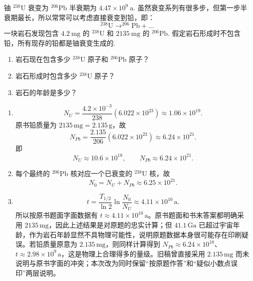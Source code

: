 \begin{exercise}\label{ex:29.25}铀 $^{238}\mathrm{U}$ 衰变为 $^{206}\mathrm{Pb}$ 半衰期为 $4.47 \times 10^9 \ \mathrm{a}$. 虽然衰变系列有很多步，但第一步半衰期最长，所以常常可以考虑直接衰变到铅，即：
$$ ^{238}\mathrm{U} \rightarrow ^{206}\mathrm{Pb} + \dots $$
一块岩石发现包含 $4.2 \ \mathrm{mg}$ 的 $^{238}\mathrm{U}$ 和 $2135 \ \mathrm{mg}$ 的 $^{206}\mathrm{Pb}$. 假定岩石形成时不包含铅，所有现存的铅都是铀衰变生成的.
\begin{enumerate}
  \item[(a)] 岩石现在包含多少 $^{238}\mathrm{U}$ 原子和 $^{206}\mathrm{Pb}$ 原子？
  \item[(b)] 岩石形成时包含多少 $^{238}\mathrm{U}$ 原子？
  \item[(c)] 岩石的年龄是多少？
\end{enumerate}\end{exercise}
\begin{solution}
\begin{enumerate}
\item[(a)]
$$
N_U=\frac{4.2\times10^{-3}}{238}(6.022\times10^{23})\approx1.06\times10^{19}.
$$
原书铅质量为 $2135\,\mathrm{mg}=2.135\,\mathrm g$，故
$$
N_{Pb}=\frac{2.135}{206}(6.022\times10^{23})\approx6.24\times10^{21}.
$$
即
$$
\boxed{N_U\approx10.6\times10^{18},\qquad N_{Pb}\approx6.24\times10^{21}}.
$$
\item[(b)] 每个最终的 $^{206}\mathrm{Pb}$ 核对应一个已衰变的 $^{238}\mathrm U$ 核，故
$$
\boxed{N_0=N_U+N_{Pb}\approx6.25\times10^{21}}.
$$
\item[(c)]
$$
t=\frac{T_{1/2}}{\ln2}\ln\frac{N_0}{N_U}\approx4.11\times10^{10}\,\mathrm a.
$$
所以按原书题面字面数据有 $\boxed{t\approx4.11\times10^{10}\,\mathrm a}$。原书题面和书末答案都明确采用 $2135\,\mathrm{mg}$，因此上述结果是对原题的忠实计算；但 $41.1\,\mathrm{Ga}$ 已超过宇宙年龄，作为岩石年龄显然不具物理可能性，说明原题数据本身很可能存在印刷疑误。若铅质量原意为 $2.135\,\mathrm{mg}$，则同样计算得到 $N_{Pb}\approx6.24\times10^{18}$、$t\approx2.98\times10^9\,\mathrm a$，这是物理上合理得多的量级。旧稿曾直接采用 $2.135\,\mathrm{mg}$ 而未说明与原书字面的冲突；本次改为同时保留“按原题作答”和“疑似小数点误印”两层说明。
\end{enumerate}
\end{solution}

